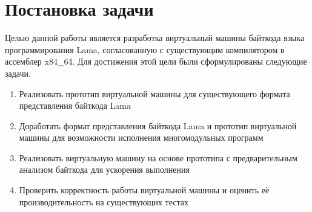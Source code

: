 
\section{Постановка задачи}
\label{sec:task}
Целью данной работы является разработка виртуальный машины байткода языка программирования Lama, согласованную с существующим компилятором в ассемблер x84\_64. Для достижения этой цели были сформулированы следующие задачи.
\begin{enumerate}
    \item Реализовать прототип виртуальной машины для существующего формата представления байткода Lama    
    \item Доработать формат представления байткода Lama и прототип виртуальной машины для возможности исполнения многомодульных программ
    \item Реализовать виртуальную машину на основе прототипа с предварительным анализом байткода для ускорения выполнения
    \item Проверить корректность работы виртуальной машины и оценить её производительность на существующих тестах
\end{enumerate}
